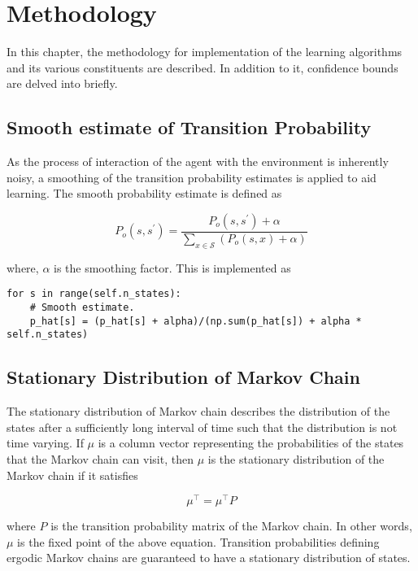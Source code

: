 \chapter{Methodology}

In this chapter, the methodology for implementation of the learning algorithms and its various constituents are described.
In addition to it, confidence bounds are delved into briefly.

\section{Smooth estimate of Transition Probability}

As the process of interaction of the agent with the environment is inherently noisy, a smoothing of the transition probability estimates is applied to aid learning.
The smooth probability estimate is defined as

\begin{equation}
    P_o(s, s^\prime) = \frac{P_o(s, s^\prime) + \alpha}{\sum_{x \in \mathcal{S}} \left(P_o(s, x) + \alpha \right)}
\end{equation}

where, $\alpha$ is the smoothing factor. This is implemented as

\begin{verbatim}
for s in range(self.n_states):
    # Smooth estimate.
    p_hat[s] = (p_hat[s] + alpha)/(np.sum(p_hat[s]) + alpha * self.n_states)
\end{verbatim}



\section{Stationary Distribution of Markov Chain}

The stationary distribution of Markov chain describes the distribution of the states after a sufficiently long interval of time such that the distribution is not time varying.
If $\mu$ is a column vector representing the probabilities of the states that the Markov chain can visit, then $\mu$ is the stationary distribution of the Markov chain if it satisfies 

\begin{equation}
    \label{eqn:mu_estimate}
    \mu^\top = \mu^\top P
\end{equation}


where $P$ is the transition probability matrix of the Markov chain. 
In other words, $\mu$ is the fixed point of the above equation.
Transition probabilities defining ergodic Markov chains are guaranteed to have a stationary distribution of states.

